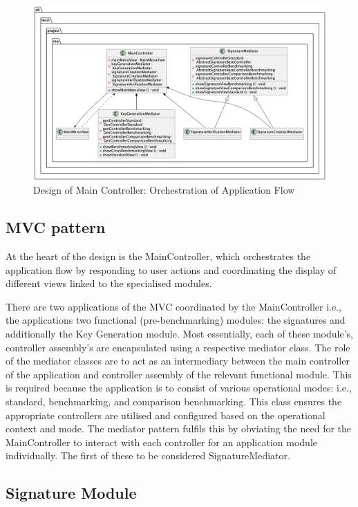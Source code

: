 \documentclass[]{final_report}
\theoremstyle{definition}
\begin{document}
\begin{figure}[H]
    \centering
    \includegraphics[width=\textwidth]{main_pictures/mainController.png}
    \caption{Design of Main Controller: Orchestration of Application Flow}
    \label{fig:MAINCONTROLLERDESIGN}
\end{figure}


\subsection{MVC pattern}
At the heart of the design is the MainController, which orchestrates the application flow by responding to user actions and coordinating the display of different views linked to the specialised modules. 

There are two applications of the MVC coordinated by the MainController i.e., the applications two functional (pre-benchmarking) modules: the signatures and additionally the Key Generation module. Most essentially, each of these module's, controller assembly's are encapsulated using a respective mediator class. The role of the mediator classes are to act as an intermediary between the main controller of the application and controller assembly of the relevant functional module. This is required because the application is to consist of various operational modes: i.e., standard, benchmarking, and comparison benchmarking. This class ensures the appropriate controllers are utilised and configured based on the operational context and mode. The mediator pattern fulfils this by obviating the need for the MainController to interact with each controller for an application module individually. The first of these to be considered SignatureMediator.



\subsection{Signature Module}
\end{document}
